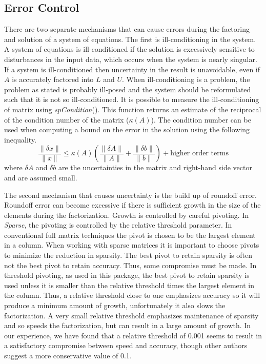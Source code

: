 \documentclass[11pt]{article}
\begin{document}
\subsection{Error Control}
There are two separate mechanisms that can cause errors during the
factoring and solution of a system of equations.  The first is
ill-conditioning in the system.  A system of equations is
ill-conditioned if the solution is excessively sensitive to
disturbances in the input data, which occurs when the system is nearly
singular.  If a system is ill-conditioned then uncertainty in the
result is unavoidable, even if $A$ is accurately factored into
$L$ and $U$.  When ill-conditioning is a problem, the problem
as stated is probably ill-posed and the system should be reformulated
such that it is not so ill-conditioned.  It is possible to measure the
ill-conditioning of matrix using \emph{spCondition}().  This function
returns an estimate of the reciprocal of the condition number of the
matrix ($\kappa ( A )$)\cite{strang80}.  The condition number can be
used when computing a bound on the error in the solution using the
following inequality\cite{golub86}.
\begin{equation}
\frac{\parallel \delta x \parallel}{\parallel x \parallel} \leq \kappa(A)
\left( \frac{\parallel \delta A \parallel}{\parallel A \parallel} +
\frac{\parallel \delta b \parallel}{\parallel b \parallel}\right) + \mbox{higher order terms}
\end{equation}
where $\delta A$ and $\delta b$ are the uncertainties in the
matrix and right-hand side vector and are assumed small.

The second mechanism that causes uncertainty is the build up of
roundoff error.  Roundoff error can become excessive if there is
sufficient growth in the size of the elements during the
factorization.  Growth is controlled by careful pivoting.  In
\emph{Sparse}, the pivoting is controlled by the 
relative threshold parameter.  In conventional full matrix techniques the
pivot is chosen to be the largest element in a column.  When working 
with sparse matrices it is important to choose pivots to minimize the
reduction in sparsity.  The best pivot to retain sparsity is often not the
best pivot to retain accuracy.  Thus, some compromise must be made.  In
threshold pivoting, as used in this package, the best pivot to retain 
sparsity is used unless it is smaller than the relative threshold
times the largest element in the column.  Thus, a relative threshold close 
to one emphasizes accuracy so it will produce a minimum
amount of growth, unfortunately it also slows the factorization.  A
very small relative threshold emphasizes maintenance of sparsity and so
speeds the factorization, but can result in a
large amount of growth.  In our experience, we have found that a relative
threshold of 0.001 seems to result in a satisfactory compromise between
speed and accuracy, though other authors suggest a more conservative
value of 0.1\cite{duff86}.
\end{document}
